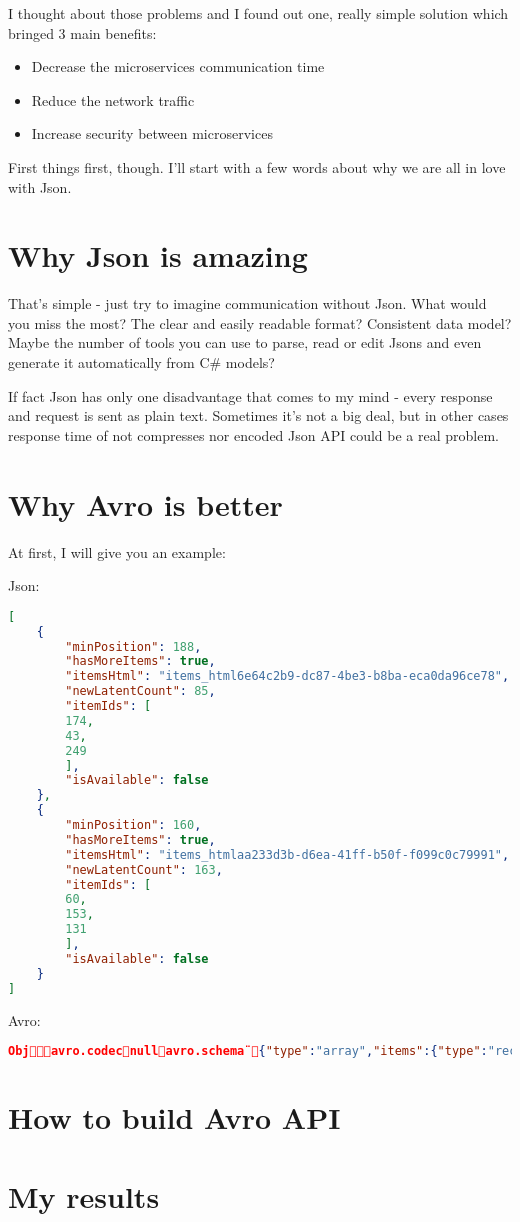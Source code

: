 \documentclass[]{article}
\begin{document}
I thought about those problems and I found out one, really simple solution which bringed 3 main benefits:
\begin{itemize}
	\item Decrease the microservices communication time
	\item Reduce the network traffic 
	\item Increase security between microservices
\end{itemize}


First things first, though. I'll start with a few words about why we are all in love with Json.


\section{Why Json is amazing}
That's simple - just try to imagine communication without Json. What would you miss the most? The clear and easily readable format? Consistent data model? Maybe the number of tools you can use to parse, read or edit Jsons and even generate it automatically from C\# models?

If fact Json has only one disadvantage that comes to my mind - every response and request is sent as plain text. Sometimes it's not a big deal, but in other cases response time of not compresses nor encoded Json API could be a real problem.  

\section{Why Avro is better}

At first, I will give you an example:

Json:

\begin{lstlisting}[language=json,firstnumber=1]
[
	{
		"minPosition": 188,
		"hasMoreItems": true,
		"itemsHtml": "items_html6e64c2b9-dc87-4be3-b8ba-eca0da96ce78",
		"newLatentCount": 85,
		"itemIds": [
		174,
		43,
		249
		],
		"isAvailable": false
	},
	{
		"minPosition": 160,
		"hasMoreItems": true,
		"itemsHtml": "items_htmlaa233d3b-d6ea-41ff-b50f-f099c0c79991",
		"newLatentCount": 163,
		"itemIds": [
		60,
		153,
		131
		],
		"isAvailable": false
	}
]
\end{lstlisting}

Avro:
\begin{lstlisting}[language=json,firstnumber=1]
Objavro.codecnullavro.schema¨{"type":"array","items":{"type":"record","name":"Dataset","fields":[{"name":"minPosition","type":"int"},{"name":"hasMoreItems","type":"boolean"},{"name":"itemsHtml","type":["null","string"]},{"name":"newLatentCount","type":"int"},{"name":"itemIds","type":{"type":"array","items":"int"}},{"name":"isAvailable","type":"boolean"}]}} /Âźľ)|ř OČëHE řř\items_html6e64c2b9-dc87-4be3-b8ba-eca0da96ce78ŞÜVň  Ŕ\items_htmlaa233d3b-d6ea-41ff-b50f-f099c0c79991Ćx˛†   /Âźľ)|ř OČëHE
\end{lstlisting}
\section{How to build Avro API}

\section{My results}
\end{document}
